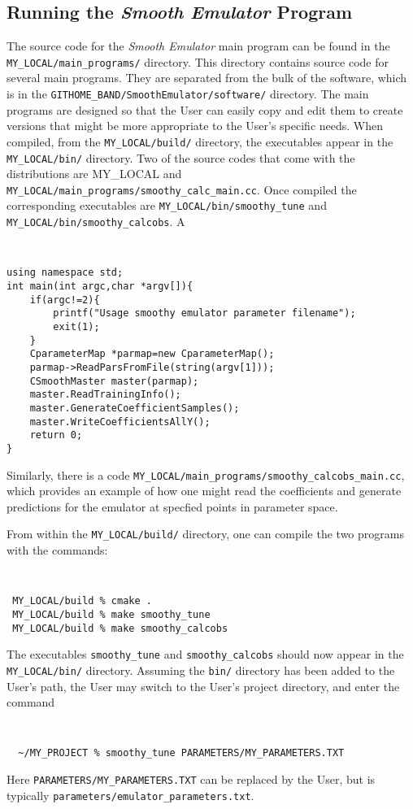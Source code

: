 \documentclass[UserManual.tex]{subfiles}
\begin{document}
\subsection{Running the {\it Smooth Emulator} Program}

The source code for the {\it Smooth Emulator} main program can be found in the {\tt MY\_LOCAL/main\_programs/} directory. This directory contains source code for several main programs. They are separated from the bulk of the software, which is in the {\tt GITHOME\_BAND/SmoothEmulator/software/} directory. The main programs are designed so that the User can easily copy and edit them to create versions that might be more appropriate to the User's specific needs. When compiled, from the {\tt MY\_LOCAL/build/} directory, the executables appear in the {\tt MY\_LOCAL/bin/} directory. Two of the source codes that come with the distributions are MY\_LOCAL and {\tt MY\_LOCAL/main\_programs/smoothy\_calc\_main.cc}. Once compiled the corresponding executables are {\tt MY\_LOCAL/bin/smoothy\_tune} and {\tt MY\_LOCAL/bin/smoothy\_calcobs}. A 
{\tt
\begin{verbatim}
using namespace std;
int main(int argc,char *argv[]){
    if(argc!=2){
        printf("Usage smoothy emulator parameter filename");
        exit(1);
    }
    CparameterMap *parmap=new CparameterMap();
    parmap->ReadParsFromFile(string(argv[1]));
    CSmoothMaster master(parmap);
    master.ReadTrainingInfo();
    master.GenerateCoefficientSamples();
    master.WriteCoefficientsAllY();
    return 0;
}
\end{verbatim}
}
Similarly, there is a code {\tt MY\_LOCAL/main\_programs/smoothy\_calcobs\_main.cc}, which provides an example of how one might read the coefficients and generate predictions for the emulator at specfied points in parameter space.

From within the {\tt MY\_LOCAL/build/} directory, one can compile the two programs with the commands:
{\tt
\begin{verbatim}
 MY_LOCAL/build % cmake .
 MY_LOCAL/build % make smoothy_tune
 MY_LOCAL/build % make smoothy_calcobs
\end{verbatim}
}
The executables {\tt smoothy\_tune} and {\tt smoothy\_calcobs} should now appear in the {\tt MY\_LOCAL/bin/} directory. Assuming the {\tt bin/} directory has been added to the User's path, the User may switch to the User's project directory, and enter the command
{\tt
\begin{verbatim}
  ~/MY_PROJECT % smoothy_tune PARAMETERS/MY_PARAMETERS.TXT
\end{verbatim}
}
Here {\tt PARAMETERS/MY\_PARAMETERS.TXT} can be replaced by the User, but is typically {\tt parameters/emulator\_parameters.txt}.
\end{document}
